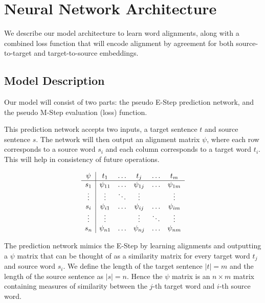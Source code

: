\documentclass[twoside,twocolumn]{article}
\begin{document}

\section{Neural Network Architecture}

We describe our model architecture to learn word alignments, along with
a combined loss function that will encode alignment by
agreement for both source-to-target and target-to-source embeddings.



\subsection{Model Description}

Our model will consist of two parts: the pseudo E-Step prediction network, and
the pseudo M-Step evaluation (loss) function.

This prediction network accepts two inputs, a target sentence $t$ and source
sentence $s$. The network will then output an alignment matrix $\psi$, where
each row corresponds to a source word $s_i$ and each column corresponds to a
target word $t_i$. This will help in consistency of future operations.

\begin{equation}
  \centering
\begin{array}{c|ccccc}
\psi & t_1       & \hdots & t_j       & \hdots & t_m       \\ \hline
s_1  & \psi_{11} & \hdots & \psi_{1j} & \hdots & \psi_{1m} \\
\vdots  & \vdots & \ddots & \vdots &  & \vdots \\
s_i  & \psi_{i1} & \hdots & \psi_{ij} & \hdots & \psi_{im} \\
\vdots  & \vdots &  & \vdots & \ddots & \vdots \\
s_n  & \psi_{n1} & \hdots & \psi_{nj} & \hdots & \psi_{nm}
\end{array}
\end{equation}

The prediction network mimics the E-Step by learning alignments and outputting
a $\psi$ matrix that can be thought of as a similarity matrix for every target
word $t_j$ and source word $s_i$. We define the length of the target sentence
$|t| = m$ and the length of the source sentence as $|s|=n$. Hence the $\psi$
matrix is an $n \times m$ matrix containing measures of similarity between the
$j$-th target word and $i$-th source word.
\end{document}
